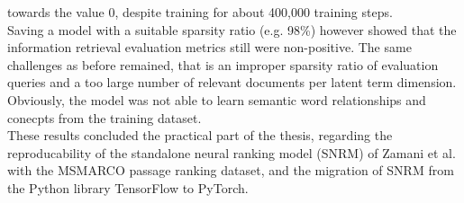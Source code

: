     towards the value 0, despite training for about 400,000 training steps.\\
Saving a model with a suitable sparsity ratio (e.g. 98\%) however showed that the information retrieval
    evaluation metrics still were non-positive.
The same challenges as before remained, that is an improper sparsity ratio of evaluation queries and 
    a too large number of relevant documents per latent term dimension.
Obviously, the model was not able to learn semantic word relationships and conecpts 
    from the training dataset.\\
These results concluded the practical part of the thesis, regarding the reproducability of the 
    standalone neural ranking model (SNRM) of
    Zamani et al. \cite{zamani:2018:from-neural-reranking-to-neural-ranking}
    with the MSMARCO passage ranking dataset, 
    and the migration of SNRM from the Python library TensorFlow to PyTorch.



    



